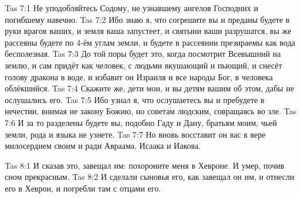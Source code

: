 \vs Tas 7:1
Не уподобляйтесь Содому,
не узнавшему ангелов Господних
и погибшему навечно.
\vs Tas 7:2
Ибо знаю я, что согрешите вы и преданы
будете в руки врагов ваших,
и земля ваша запустеет, и святыни ваши разрушатся,
вы же рассеяны будете по 4-ём углам земли,
и будете в рассеянии презираемы как вода бесполезная.
\vs Tas 7:3
До той поры будет это, когда посмотрит Всевышний на землю,
и сам придёт как человек, с людьми вкушающий и пьющий,
и снесёт голову дракона в воде, и избавит он Израиля и все народы
Бог, в человека облёкшийся.
\vs Tas 7:4
Скажите же, дети мои, и вы детям вашим об этом,
дабы не ослушались его.
\vs Tas 7:5
Ибо узнал я, что ослушаетесь вы и пребудете в нечестии,
внимая не закону Божию, но советам людским,
совращаясь во зле.
\vs Tas 7:6
И за то разделены будете вы, подобно Гаду и Дану, братьям моим,
чьей земли, рода и языка не узнете.
\vs Tas 7:7
Но вновь восставит он вас в вере милосердием своим
и ради Авраама, Исаака и Иакова.

\vs Tas 8:1
И сказав это, завещал им: похороните меня в Хевроне.
И умер, почив сном прекрасным.
\vs Tas 8:2
И сделали сыновья его, как завещал он им,
и отнесли его в Хеврон, и погребли там с отцами его.
